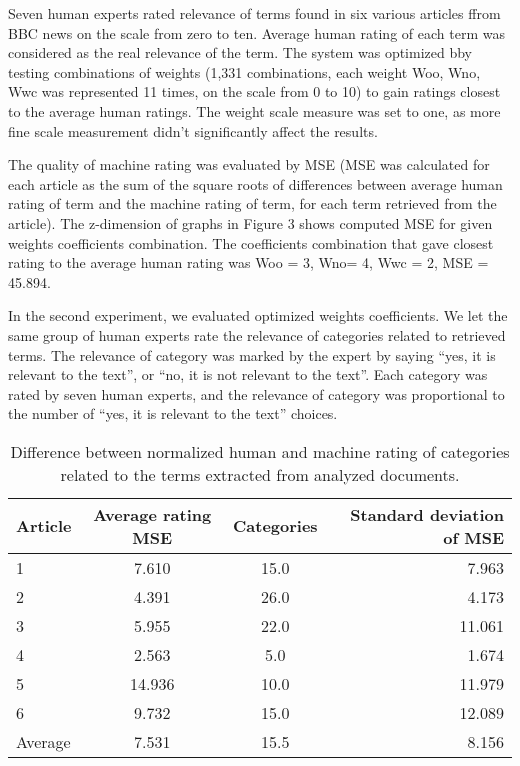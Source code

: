 \documentclass{llncs}
\begin{document}
Seven human experts rated relevance of terms found in six various articles ffrom BBC news on the scale from zero to ten. Average human rating of each term was considered as the real relevance of the term. The system was optimized bby testing combinations of weights (1,331 combinations, each weight Woo, Wno, Wwc was represented 11 times, on the scale from 0 to 10) to gain ratings closest to the average human ratings. The weight scale measure was set to one, as more fine scale measurement didn’t significantly affect the results. 
 
The quality of machine rating was evaluated by MSE (MSE was calculated for each article as the sum of the square roots of differences between average human rating of term and the machine rating of term, for each term retrieved from the article). The z-dimension of graphs in Figure 3 shows computed MSE for given weights coefficients combination. The coefficients combination that gave closest rating to the average human rating was Woo = 3, Wno= 4, Wwc = 2, MSE = 45.894. 

In the second experiment, we evaluated optimized weights coefficients. We let the same group of human experts rate the relevance of categories related to retrieved terms. The relevance of category was marked by the expert by saying “yes, it is relevant to the text”, or “no, it is not relevant to the text”. Each category was rated by seven human experts, and the relevance of category was proportional to the number of “yes, it is relevant to the text” choices. 

\begin{table}[ht]
\centering
\caption{Difference between normalized human and machine rating of categories related to the terms extracted from analyzed documents. }
\label{tab1}
\begin{tabular}{|l|c|c|r|}
\hline
Article & Average rating MSE & Categories & Standard deviation of MSE \\
\hline
1 & 7.610 & 15.0 & 7.963 \\
2 & 4.391 & 26.0 & 4.173\\
3 & 5.955 & 22.0 & 11.061 \\
4 & 2.563 & 5.0 & 1.674 \\
5 & 14.936 & 10.0 & 11.979 \\
6 & 9.732 &  15.0 & 12.089\\
Average & 7.531 & 15.5 & 8.156 \\
\hline
\end{tabular}
\end{table}
\end{document}
